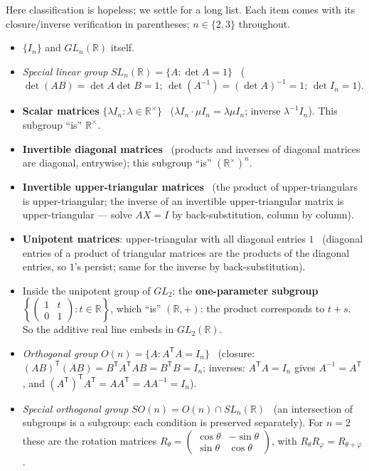 \documentclass[11pt]{report}
\begin{document}
\begin{exbox}\label{ex:subgroups-gl2-r-gl3-r}
Here classification is hopeless; we settle for a long list. Each item comes with its closure/inverse verification in parentheses; $n \in \{2, 3\}$ throughout.
\begin{itemize}[nosep]
    \item $\{I_n\}$ and $GL_n(\mathbb{R})$ itself.
    \item \emph{Special linear group} $SL_n(\mathbb{R}) = \{A : \det A = 1\}$ \ ($\det(AB) = \det A \det B = 1$; $\det(A^{-1}) = (\det A)^{-1} = 1$; $\det I_n = 1$).
    \item \textbf{Scalar matrices} $\{\lambda I_n : \lambda \in \mathbb{R}^\times\}$ \ ($\lambda I_n \cdot \mu I_n = \lambda\mu I_n$; inverse $\lambda^{-1} I_n$). This subgroup ``is'' $\mathbb{R}^\times$.
    \item \textbf{Invertible diagonal matrices} \ (products and inverses of diagonal matrices are diagonal, entrywise); this subgroup ``is'' $(\mathbb{R}^\times)^n$.
    \item \textbf{Invertible upper-triangular matrices} \ (the product of upper-triangulars is upper-triangular; the inverse of an invertible upper-triangular matrix is upper-triangular --- solve $AX = I$ by back-substitution, column by column).
    \item \textbf{Unipotent matrices}: upper-triangular with all diagonal entries $1$ \ (diagonal entries of a product of triangular matrices are the products of the diagonal entries, so $1$'s persist; same for the inverse by back-substitution).
    \item Inside the unipotent group of $GL_2$: the \textbf{one-parameter subgroup} $\left\{ \begin{pmatrix} 1 & t \\ 0 & 1 \end{pmatrix} : t \in \mathbb{R} \right\}$, which ``is'' $(\mathbb{R}, +)$: the product corresponds to $t + s$. So the additive real line embeds in $GL_2(\mathbb{R})$.
    \item \emph{Orthogonal group} $O(n) = \{A : A^\mathsf{T} A = I_n\}$ \ (closure: $(AB)^\mathsf{T}(AB) = B^\mathsf{T} A^\mathsf{T} A B = B^\mathsf{T} B = I_n$; inverses: $A^\mathsf{T}A = I_n$ gives $A^{-1} = A^\mathsf{T}$, and $(A^\mathsf{T})^\mathsf{T} A^\mathsf{T} = A A^\mathsf{T} = A A^{-1} = I_n$).
    \item \emph{Special orthogonal group} $SO(n) = O(n) \cap SL_n(\mathbb{R})$ \ (an intersection of subgroups is a subgroup: each condition is preserved separately). For $n = 2$ these are the rotation matrices $R_\theta = \begin{pmatrix} \cos\theta & -\sin\theta \\ \sin\theta & \cos\theta \end{pmatrix}$, with $R_\theta R_\varphi = R_{\theta + \varphi}$.

\end{itemize}
\end{exbox}
\end{document}
